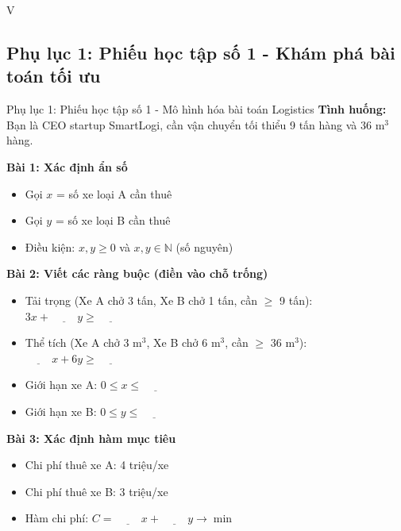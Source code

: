 \documentclass[12pt,a4paper]{article}
\begin{document}
\begin{competitionsection}{V}
\vspace{0.5cm}
\subsection*{Phụ lục 1: Phiếu học tập số 1 - Khám phá bài toán tối ưu}
\begin{phieuhoc_tap_box}{Phụ lục 1: Phiếu học tập số 1 - Mô hình hóa bài toán Logistics}
\textbf{Tình huống:} Bạn là CEO startup SmartLogi, cần vận chuyển tối thiểu 9 tấn hàng và 36 m$^3$ hàng.

\vspace{0.5cm}
\textbf{Bài 1: Xác định ẩn số}
\begin{itemize}[leftmargin=*,noitemsep]
\item Gọi $x$ = số xe loại A cần thuê
\item Gọi $y$ = số xe loại B cần thuê
\item Điều kiện: $x, y \ge 0$ và $x, y \in \mathbb{N}$ (số nguyên)
\end{itemize}

\textbf{Bài 2: Viết các ràng buộc (điền vào chỗ trống)}
\begin{itemize}[leftmargin=*,noitemsep]
\item Tải trọng (Xe A chở 3 tấn, Xe B chở 1 tấn, cần $\ge$ 9 tấn): $3x + \underline{\hspace{1cm}}y \ge \underline{\hspace{1cm}}$
\item Thể tích (Xe A chở 3 m$^3$, Xe B chở 6 m$^3$, cần $\ge$ 36 m$^3$): $\underline{\hspace{1cm}}x + 6y \ge \underline{\hspace{1cm}}$
\item Giới hạn xe A: $0 \le x \le \underline{\hspace{1cm}}$
\item Giới hạn xe B: $0 \le y \le \underline{\hspace{1cm}}$
\end{itemize}

\textbf{Bài 3: Xác định hàm mục tiêu}
\begin{itemize}[leftmargin=*,noitemsep]
\item Chi phí thuê xe A: 4 triệu/xe
\item Chi phí thuê xe B: 3 triệu/xe
\item Hàm chi phí: $C = \underline{\hspace{1cm}}x + \underline{\hspace{1cm}}y \to \min$
\end{itemize}


\end{phieuhoc_tap_box}
\end{competitionsection}
\end{document}
